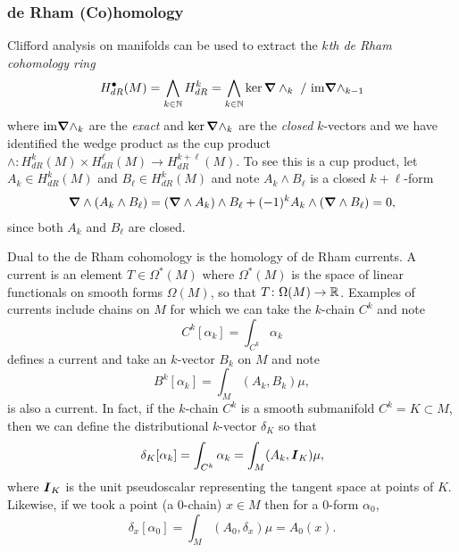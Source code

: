 \documentclass[conf]{new-aiaa}
\begin{document}
\subsubsection{de Rham (Co)homology}

Clifford analysis on manifolds can be used to extract the \emph{$k$th de Rham cohomology ring}
\begin{equation}
H^\bullet_{dR}(M) = \bigwedge_{k \in \mathbb{N}} H^k_{dR} = \bigwedge_{k \in \mathbb{N}} \ker \boldsymbol{\nabla} \wedge_k ~/~ \mathrm{im} \boldsymbol{\nabla} \wedge_{k-1}
\end{equation}
where $\mathrm{im} \boldsymbol{\nabla} \wedge_k$ are the \emph{exact} and $\ker \boldsymbol{\nabla} \wedge_k$ are the \emph{closed} $k$-vectors and we have identified the wedge product as the cup product $\wedge \colon H^k_{dR}(M) \times H^\ell_{dR}(M) \to H^{k+\ell}_{dR}(M)$. To see this is a cup product, let $A_k \in H^k_{dR}(M)$ and $B_\ell \in H^k_{dR}(M)$ and note $A_k \wedge B_\ell$ is a closed $k+\ell$-form
\begin{align}
\boldsymbol{\nabla} \wedge (A_k \wedge B_\ell) = (\boldsymbol{\nabla} \wedge A_k) \wedge B_\ell + (-1)^k A_k \wedge (\boldsymbol{\nabla} \wedge B_\ell) = 0,
\end{align}
since both $A_k$ and $B_\ell$ are closed. 

Dual to the de Rham cohomology is the homology of de Rham currents. A current is an element $T\in \Omega^*(M)$ where $\Omega^*(M)$ is the space of linear functionals on smooth forms $\Omega(M)$, so that $T\colon \Omega(M)\to \mathbb{R}$. Examples of currents include chains on $M$ for which we can take the $k$-chain $C^k$ and note
\begin{equation}
    C^k[\alpha_k] = \int_{C^k} \alpha_k
\end{equation}
defines a current and take an $k$-vector $B_{k}$ on $M$ and note
\begin{equation}
    B^{k}[\alpha_k] = \int_M (A_k,B_k) \mu,
\end{equation}
is also a current. In fact, if the $k$-chain $C^k$ is a smooth submanifold $C^k=K\subset M$, then we can define the distributional $k$-vector $\delta_K$ so that
\begin{equation}
\delta_K[\alpha_k] = \int_{C^k} \alpha_k = \int_{M} (A_k, \boldsymbol{I}_K)\mu,
\end{equation}
where $\boldsymbol{I}_K$ is the unit pseudoscalar representing the tangent space at points of $K$. Likewise, if we took a point (a $0$-chain) $x\in M$ then for a $0$-form $\alpha_0$,
\begin{equation}
\delta_x[\alpha_0] = \int_M (A_0,\delta_x) \mu = A_0(x).
\end{equation}
\end{document}
